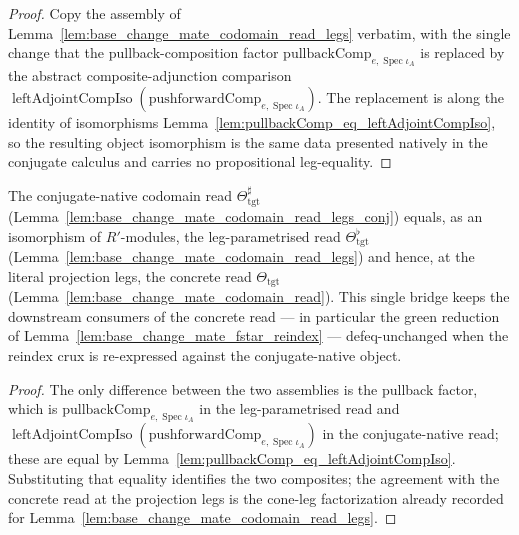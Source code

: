 \begin{proof}
  Copy the assembly of Lemma~\ref{lem:base_change_mate_codomain_read_legs} verbatim, with the single
  change that the pullback-composition factor \(\mathrm{pullbackComp}_{e,\operatorname{Spec}\iota_A}\) is
  replaced by the abstract composite-adjunction comparison
  \(\operatorname{leftAdjointCompIso}(\mathrm{pushforwardComp}_{e,\operatorname{Spec}\iota_A})\). The
  replacement is along the identity of isomorphisms
  Lemma~\ref{lem:pullbackComp_eq_leftAdjointCompIso}, so the resulting object isomorphism is the same
  data presented natively in the conjugate calculus and carries no propositional leg-equality.
\end{proof}

\begin{lemma}

  \label{lem:base_change_mate_codomain_read_legs_conj_eq}
  The conjugate-native codomain read \(\Theta_{\mathrm{tgt}}^{\sharp}\)
  (Lemma~\ref{lem:base_change_mate_codomain_read_legs_conj}) equals, as an isomorphism of
  \(R'\)-modules, the leg-parametrised read \(\Theta_{\mathrm{tgt}}^{\flat}\)
  (Lemma~\ref{lem:base_change_mate_codomain_read_legs}) and hence, at the literal projection legs, the
  concrete read \(\Theta_{\mathrm{tgt}}\) (Lemma~\ref{lem:base_change_mate_codomain_read}). This single
  bridge keeps the downstream consumers of the concrete read — in particular the green reduction of
  Lemma~\ref{lem:base_change_mate_fstar_reindex} — defeq-unchanged when the reindex crux is re-expressed
  against the conjugate-native object.
\end{lemma}

\begin{proof}
  The only difference between the two assemblies is the pullback factor, which is
  \(\mathrm{pullbackComp}_{e,\operatorname{Spec}\iota_A}\) in the leg-parametrised read and
  \(\operatorname{leftAdjointCompIso}(\mathrm{pushforwardComp}_{e,\operatorname{Spec}\iota_A})\) in the
  conjugate-native read; these are equal by
  Lemma~\ref{lem:pullbackComp_eq_leftAdjointCompIso}. Substituting that equality identifies the two
  composites; the agreement with the concrete read at the projection legs is the cone-leg factorization
  already recorded for Lemma~\ref{lem:base_change_mate_codomain_read_legs}.
\end{proof}


